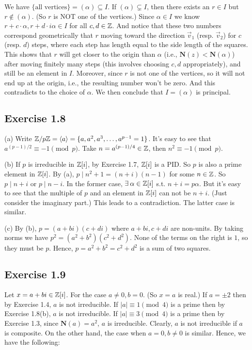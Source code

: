 \documentclass[../Marcus.tex]{subfiles}
\begin{document}
We have $\{\text{all vertices}\}=(\alpha)\subseteq I$. If $(\alpha)\varsubsetneq I$, then there exists an $r\in I$ but $r\notin(\alpha)$. (So $r$ is NOT one of the vertices.) Since $\alpha\in I$ we know $r+c\cdot\alpha,r+d\cdot i\alpha\in I$ for all $c,d\in\mathbb{Z}$. And notice that these two numbers correspond geometrically that $r$ moving toward the direction $\vec v_1$ (resp. $\vec v_2$) for $c$ (resp. $d$) steps, where each step has length equal to the side length of the squares. This shows that $r$ will get closer to the origin than $\alpha$ (i.e., $\mathbf{N}(z)<\mathbf{N}(\alpha)$) after moving finitely many steps (this involves choosing $c,d$ appropriately), and still be an element in $I$. Moreover, since $r$ is not one of the vertices, so it will not end up at the origin, i.e., the resulting number won't be zero. And this contradicts to the choice of $\alpha$. We then conclude that $I=(\alpha)$ is principal.
 
\subsection*{Exercise 1.8}

(a) Write $\mathbb{Z}/p\mathbb{Z}=\langle a \rangle=\{a,a^2,a^3,\ldots,a^{p-1}=1\}$. It's easy to see that $a^{(p-1)/2}\equiv -1 \pmod{p}$. Take $n=a^{(p-1)/4}\in\mathbb{Z}$, then $n^2\equiv -1\pmod{p}$.

(b) If $p$ is irreducible in $\mathbb{Z}[i]$, by Exercise 1.7, $\mathbb{Z}[i]$ is a PID. So $p$ is also a prime element in $\mathbb{Z}[i]$. By (a), $p\mid n^2+1=(n+i)(n-1)$ for some $n\in\mathbb{Z}$. So $p\mid n+i$ or $p\mid n-i$. In the former case, $\exists \alpha\in\ZZ[i]$ s.t. $n+i=p\alpha$. But it's easy to see that the multiple of $p$ and an element in $\mathbb{Z}[i]$ can not be $n+i$. (Just consider the imaginary part.) This leads to a contradiction. The latter case is similar.

(c) By (b), $p=(a+bi)(c+di)$ where $a+bi,c+di$ are non-units. By taking norms we have $p^2=(a^2+b^2)(c^2+d^2)$. None of the terms on the right is $1$, so they must be $p$. Hence, $p=a^2+b^2=c^2+d^2$ is a sum of two squares.

\subsection*{Exercise 1.9}

Let $x=a+bi\in\mathbb{Z}[i]$. For the case $a\neq 0,b=0$. (So $x=a$ is real.) If $a=\pm2$ then by Exercise 1.4, $a$ is not irreducible. If $|a|\equiv 1\pmod{4}$ is a prime then by Exercise 1.8(b), $a$ is not irreducible. If $|a|\equiv 3\pmod{4}$ is a prime then by Exercise 1.3, since $\mathbf{N}(a)=a^2$, $a$ is irreducible. Clearly, $a$ is not irreducible if $a$ is composite. On the other hand, the case when $a=0,b\neq 0$ is similar. Hence, we have the following:
\end{document}
